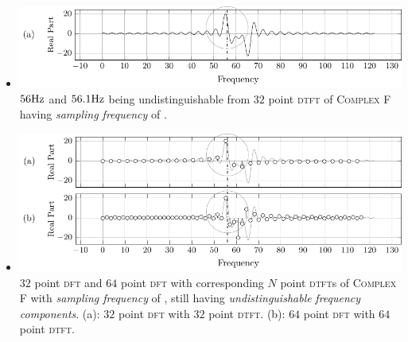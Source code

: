 \documentclass[../../course]{subfiles}
\begin{document}
\begin{itemize} [label=]
\begin{itemize} [label=]
            \item
                \begin{minipage}[b] {0.85\textwidth}
                    \vspace{6pt}
                    \centering
                     {
                        \includegraphics[height = 0.8\textheight] {tikzpics/plotDtftCloseFreq.pdf}
                    }
                     {
                        $\freqXTwo \si{Hz}$ and $\freqXThree \si{Hz}$ being undistinguishable from $32$
                        point \textsc{dtft} of \textsc{Complex F} having \emph{sampling frequency} of
                        \sampFreqSligGreatJust.
                    }
                    \label{plt:dtftCloseFreq}
                \end{minipage}

            \item
                \begin{minipage}[b] {0.85\textwidth}
                    \vspace{6pt}
                    \centering
                     {
                        \includegraphics[height = 0.8\textheight] {tikzpics/plotDftCloseFreq.pdf}
                    }
                     {
                        $32$ point \textsc{dft} and $64$ point \textsc{dft} with corresponding $N$ point
                        \textsc{dtft}s of \textsc{Complex F} with \emph{sampling frequency} of \sampFreqSligGreatJust,
                        still having \emph{undistinguishable} \emph{frequency components}.
                        (a): $32$ point \textsc{dft} with $32$ point \textsc{dtft}.
                        (b): $64$ point \textsc{dft} with $64$ point \textsc{dtft}.
                    }
                    \label{plt:dftCloseFreq}
                \end{minipage}


\end{itemize}
\end{itemize}
\end{document}
